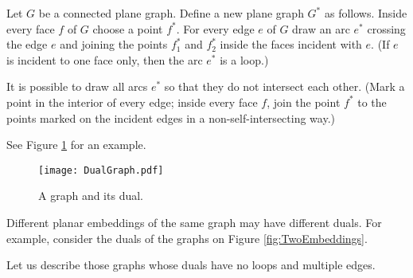 

\setcounter{section}{3}
\setcounter{subsection}{4}
\setcounter{dfn}{11}

Let $G$ be a connected plane graph.
Define a new plane graph $G^*$ as follows.
Inside every face $f$ of $G$ choose a point $f^*$.
For every edge $e$ of $G$ draw an arc $e^*$ crossing the edge $e$ and joining the points $f_1^*$ and $f_2^*$ inside the faces incident with $e$.
(If $e$ is incident to one face only, then the arc $e^*$ is a loop.)

It is possible to draw all arcs $e^*$ so that they do not intersect each other.
(Mark a point in the interior of every edge;
inside every face $f$, join the point $f^*$ to the points marked on the incident edges in a non-self-intersecting way.)

See Figure \ref{fig:DualGraph} for an example.

\begin{figure}[ht]
\begin{center}
\texttt{[image: DualGraph.pdf]}
\end{center}
\caption{A graph and its dual.}
\label{fig:DualGraph}
\end{figure}

Different planar embeddings of the same graph may have different duals.
For example, consider the duals of the graphs on Figure \ref{fig:TwoEmbeddings}.

Let us describe those graphs whose duals have no loops and multiple edges.



